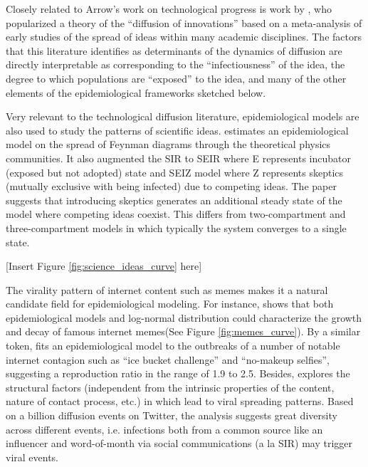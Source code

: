 Closely related to Arrow's work on technological progress is work by \href{https://en.wikipedia.org/wiki/Diffusion_of_innovations}{\cite{rogers1962diffusion}}, who popularized a theory of the ``diffusion of innovations'' based on a meta-analysis of early studies of the spread of ideas within many academic disciplines.  The factors that this literature identifies as determinants of the dynamics of diffusion are directly interpretable as corresponding to the ``infectiousness'' of the idea, the degree to which populations are ``exposed'' to the idea, and many of the other elements of the epidemiological frameworks sketched below.


	Very relevant to the technological diffusion literature, epidemiological models are also used to study the patterns of scientific ideas. \href{https://github.com/iworld1991/EpiExp/blob/master/Literature/bettencourt2006power.pdf}{\cite{bettencourt2006power}} estimates an epidemiological model on the spread of Feynman diagrams through the theoretical physics communities. It also augmented the SIR to SEIR where E represents incubator (exposed but not adopted) state and SEIZ model where Z represents skeptics (mutually  exclusive with being infected) due to competing ideas. The paper suggests that introducing skeptics generates an additional steady state of the model where competing ideas coexist. This differs from two-compartment and three-compartment models in which typically the system converges to a single state.

		\begin{center}
			[Insert Figure \ref{fig:science_ideas_curve} here]
		\end{center}

	The virality pattern of internet content such as memes makes it a natural candidate field for epidemiological modeling. For instance, \href{https://github.com/iworld1991/EpiExp/blob/master/Literature/bauckhage2011insights.pdf}{\cite{bauckhage2011insights}} shows that both epidemiological models and log-normal distribution could characterize the growth and decay of famous internet memes(See Figure \ref{fig:memes_curve}).  By a similar token, \href{https://github.com/iworld1991/EpiExp/blob/master/Literature/kucharski2016modelling.pdf}{\cite{kucharski2016modelling}} fits an epidemiological model to the outbreaks of a number of notable internet contagion such as ``ice bucket challenge'' and ``no-makeup selfies'', suggesting a reproduction ratio in the range of 1.9 to 2.5.
	Besides, 	\href{http://cs.stanford.edu/~ashton/pubs/twiral.pdf}{\cite{goel2016structural}} explores the structural factors (independent from the intrinsic properties of the content, nature of contact process, etc.) in which lead to viral spreading patterns.  Based on a billion diffusion events on Twitter, the analysis suggests great diversity across different events, i.e.  infections both from a common source like an influencer and word-of-month via social communications (a la SIR) may trigger viral events.

